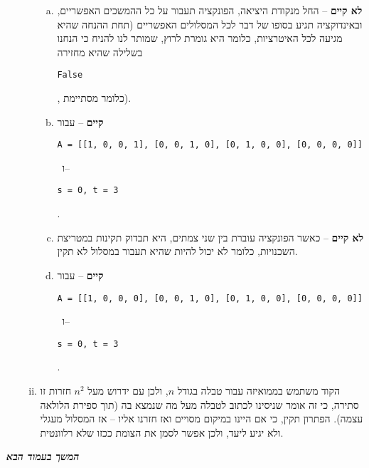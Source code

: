 \documentclass[]{article}
\newcommand\en[1] {\begin{otherlanguage}{english}#1\end{otherlanguage}}
\newcommand\ttt[1]{\en{\footnotesize\texttt{#1}\normalsize}}
\newcommand\npage {\vfil {\hfil \textbf{\textit{המשך בעמוד הבא}}} \hfil \vfil \pagebreak}
\begin{document}
\begin{enumerate}[A']
\begin{enumerate}[i.]
\begin{enumerate}[a.]
					\item \textbf{לא קיים} – החל מנקודת היציאה, הפונקציה תעבור על כל ההמשכים האפשריים, ובאינדוקציה תגיע בסופו של דבר לכל המסלולים האפשריים (תחת ההנחה שהיא מגיעה לכל האיטרציות, כלומר היא גומרת לרוץ, שמותר לנו להניח כי הנחנו בשלילה שהיא מחזירה \ttt{False}, כלומר מסתיימת). 
					\item \textbf{קיים} – עבור \ttt{A = [[1, 0, 0, 1], [0, 0, 1, 0], [0, 1, 0, 0], [0, 0, 0, 0]]} \ ו–\ttt{s = 0, t = 3}. 
					\item \textbf{לא קיים} – כאשר הפונקציה עוברת בין שני צמתים, היא תבדוק תקינות במטריצת השכנויות, כלומר לא יכול להיות שהיא תעבור במסלול לא תקין. 
					\item \textbf{קיים} – עבור \ttt{A = [[1, 0, 0, 0], [0, 0, 1, 0], [0, 1, 0, 0], [0, 0, 0, 0]]} \ ו–\ttt{s = 0, t = 3}. 
				\end{enumerate}
				\item הקוד משתמש בממואיזה עבור טבלה בגודל $n$, ולכן עם ידרוש מעל $n^2$ חזרות זו סתירה, כי זה אומר שניסינו לכתוב לטבלה מעל מה שנמצא בה (תוך ספירת הלולאה עצמה). הפתרון תקין, כי אם היינו במיקום מסויים ואז חזרנו אליו – אז המסלול מעגלי ולא יגיע ליעד, ולכן אפשר לסמן את הצומת ככזו שלא רלוונטית. 
			\end{enumerate}
		\end{enumerate}
		
		\npage
\end{document}
